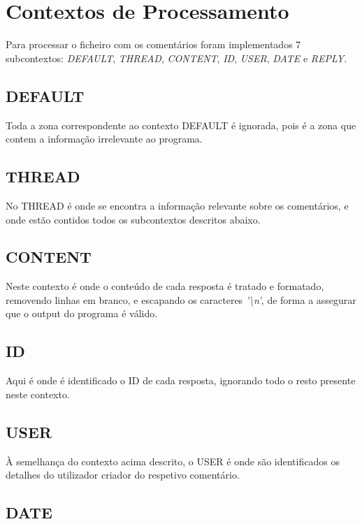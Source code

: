 \documentclass[a4paper]{report}
\begin{document}
\section{Contextos de Processamento}

Para processar o ficheiro com os comentários foram implementados 7 subcontextos:
\textit{DEFAULT}, \textit{THREAD}, \textit{CONTENT}, \textit{ID}, \textit{USER},
\textit{DATE} e \textit{REPLY}.

\subsection{DEFAULT}

Toda a zona correspondente ao contexto DEFAULT é ignorada, pois é a zona
que contem a informação irrelevante ao programa.

\subsection{THREAD}

No THREAD é onde se encontra a informação relevante sobre os comentários,
e onde estão contidos todos os subcontextos descritos abaixo.

\subsection{CONTENT}

Neste contexto é onde o conteúdo de cada resposta é tratado e formatado,
removendo linhas em branco, e escapando os caracteres \textit{'\textbackslash n'},
de forma a assegurar que o output do programa é válido.

\subsection{ID}

Aqui é onde é identificado o ID de cada resposta, ignorando todo o resto
presente neste contexto.

\subsection{USER}

À semelhança do contexto acima descrito, o USER é onde são identificados
os detalhes do utilizador criador do respetivo comentário.

\subsection{DATE}
\end{document}
